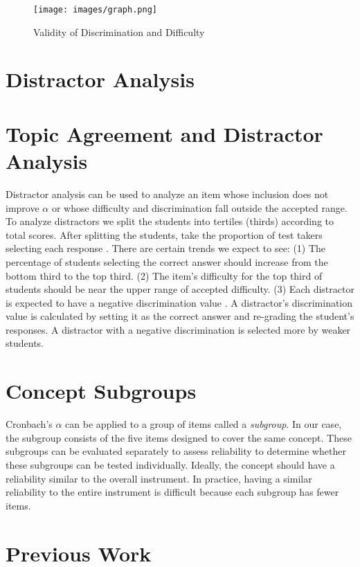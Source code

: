 \iflong
\begin{figure}[ht]
    \begin{center}
    \advance\leftskip-3cm
    \advance\rightskip-3cm
    \texttt{[image: images/graph.png]}
    \caption{Validity of Discrimination and Difficulty}
    \label{fig:ideal}
\end{center}
\end{figure}
\fi

\iflong
\section{Distractor Analysis}
\fi
\ifshort
\section{Topic Agreement and Distractor Analysis}
\fi


Distractor analysis can be used to analyze an item whose inclusion does not improve $\alpha$ or whose difficulty and discrimination fall outside the accepted range. To analyze distractors we split the students into tertiles (thirds) according to total scores. After splitting the students, take the proportion of test takers selecting each response \cite{og_ctt}. There are certain trends we expect to see: (1) The percentage of students selecting the correct answer should increase from the bottom third to the top third. (2) The item's difficulty for the top third of students should be near the upper range of accepted difficulty. (3) Each distractor is expected to have a negative discrimination value \cite{distractor}. A distractor's discrimination value is calculated by setting it as the correct answer and re-grading the student's responses. A distractor with a negative discrimination is selected more by weaker students. %

\section{Concept Subgroups}

Cronbach's $\alpha$ can be applied to a group of items called a \textit{subgroup}. In our case, the subgroup consists of the five items designed to cover the same concept. These subgroups can be evaluated separately to assess reliability to determine whether these subgroups can be tested individually. Ideally, the concept should have a reliability similar to the overall instrument. In practice, having a similar reliability to the entire instrument is difficult because each subgroup has fewer items. 


\iflong

\section{Previous Work}


\fi